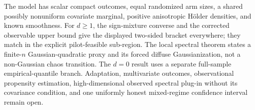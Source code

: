 The model has scalar compact outcomes, equal randomized arm sizes, a shared possibly nonuniform covariate marginal, positive anisotropic H\"older densities, and known smoothness.  For \(d\ge1\), the sign-mixture converse and the corrected observable upper bound give the displayed two-sided bracket everywhere; they match in the explicit pilot-feasible sub-region.  The local spectral theorem states a finite-\(n\) Gaussian-quadratic proxy and its forced diffuse Gaussianization, not a non-Gaussian chaos transition.  The \(d=0\) result uses a separate full-sample empirical-quantile branch.  Adaptation, multivariate outcomes, observational propensity estimation, high-dimensional observed spectral plug-in without its covariance condition, and one uniformly honest mixed-regime confidence interval remain open.